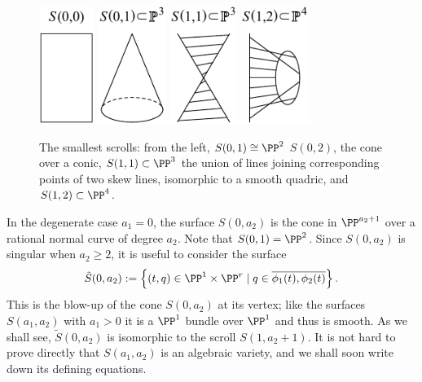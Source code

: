 \begin{figure}
\inprogress
\centerline {%
\includegraphics[height=1.5in]{"main/Fig16-1A"}\quad
\includegraphics[height=1.5in]{"main/Fig16-1B"}\quad
\includegraphics[height=1.5in]{"main/Fig16-1C"}\quad
\includegraphics[height=1.5in]{"main/Fig16-1D"}%
}
\caption{The smallest scrolls: from the left, $S(0,1) \cong \PP^{2}$ 
$S(0,2)$, the cone over a conic, $S(1,1)\subset \PP^{3}$ the union of lines joining corresponding points of two skew lines, isomorphic to a smooth quadric,
and $S(1,2)\subset \PP^{4}$.}
\label{Fig16.1}
\end{figure}


In the degenerate case $a_{1}= 0$, the surface $S(0,a_{2})$ is the cone
in $\PP^{a_{2}+1}$ over a rational normal curve of degree $a_{2}$. Note that $S(0,1) = \PP^{2}$. Since $S(0,a_2)$ is singular when $a_2\geq 2$, it is useful to consider the surface
$$
\tilde S(0, a_2) := \left\{ (t, q) \in \PP^1 \times \PP^r  \mid q \in \overline{\phi_1(t), \phi_2(t)}\right\}.
$$
This is the blow-up of the cone $S(0, a_2)$ at its vertex; like the surfaces $S(a_1,a_2)$ with $a_1 > 0$ it is a $\PP^1$ bundle over $\PP^1$ and thus is smooth. As we shall see, $\tilde S(0, a_2)$ is isomorphic to the scroll $S(1, a_2+1)$.
It is not hard to prove directly that $S(a_1,a_2)$ is an algebraic variety, and we shall soon write down its defining equations.

